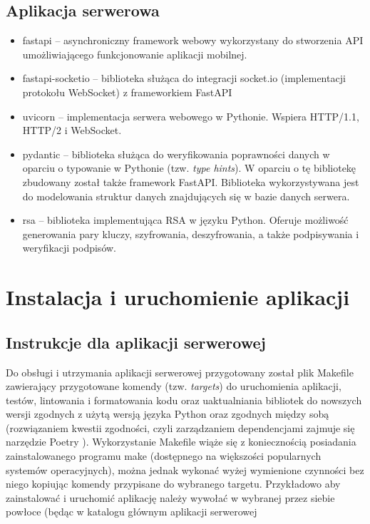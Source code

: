 \documentclass[../main.tex]{subfiles}
\begin{document}
\subsection{Aplikacja serwerowa}

\begin{itemize}
	\item fastapi -- asynchroniczny framework webowy wykorzystany do stworzenia API umożliwiającego funkcjonowanie aplikacji mobilnej.
	\item fastapi-socketio -- biblioteka służąca do integracji socket.io (implementacji protokołu WebSocket) z frameworkiem FastAPI
	\item uvicorn -- implementacja serwera webowego w Pythonie. Wspiera HTTP/1.1, HTTP/2 i WebSocket.
	\item pydantic -- biblioteka służąca do weryfikowania poprawności danych w oparciu o typowanie w Pythonie (tzw. \textit{type hints}). W oparciu o tę bibliotekę zbudowany został także framework FastAPI. Biblioteka wykorzystywana jest do modelowania struktur danych znajdujących się w bazie danych serwera.
	\item rsa -- biblioteka implementująca RSA w języku Python. Oferuje możliwość generowania pary kluczy, szyfrowania, deszyfrowania, a także podpisywania i weryfikacji podpisów.
\end{itemize}

\section{Instalacja i uruchomienie aplikacji}

\subsection{Instrukcje dla aplikacji serwerowej}

Do obsługi i utrzymania aplikacji serwerowej przygotowany został plik Makefile zawierający przygotowane komendy (tzw. \textit{targets}) do uruchomienia aplikacji, testów, lintowania i formatowania kodu oraz uaktualniania bibliotek do nowszych wersji zgodnych z użytą wersją języka Python oraz zgodnych między sobą (rozwiązaniem kwestii zgodności, czyli zarządzaniem dependencjami zajmuje się narzędzie Poetry \cite{poetry}). Wykorzystanie Makefile wiąże się z koniecznością posiadania zainstalowanego programu make (dostępnego na większości popularnych systemów operacyjnych), można jednak wykonać wyżej wymienione czynności bez niego kopiując komendy przypisane do wybranego targetu. Przykładowo aby zainstalować i uruchomić aplikację należy wywołać w wybranej przez siebie powłoce (będąc w katalogu głównym aplikacji serwerowej
\end{document}
